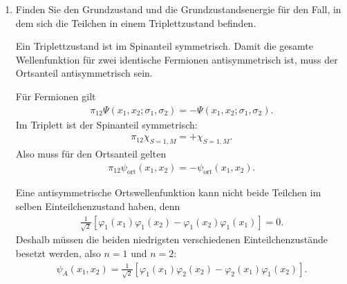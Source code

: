 \documentclass[11pt,a4paper]{scrartcl}
\newcommand{\Pex}{\pi_{12}}
\begin{document}
    \begin{enumerate}[label=(\alph*)]
        \item Finden Sie den Grundzustand und die Grundzustandsenergie für den Fall, in dem sich die Teilchen in einem Triplettzustand befinden.

        \begin{calculationbox}
            Ein Triplettzustand ist im Spinanteil symmetrisch. Damit die gesamte Wellenfunktion für zwei identische Fermionen antisymmetrisch ist, muss der Ortsanteil antisymmetrisch sein.

            \begin{calculationbox}[title=Symmetriebedingung]
                Für Fermionen gilt
                \begin{align*}
                    \Pex\Psi(x_1,x_2;\sigma_1,\sigma_2)=-\Psi(x_1,x_2;\sigma_1,\sigma_2).
                \end{align*}
                Im Triplett ist der Spinanteil symmetrisch:
                \begin{align*}
                    \Pex\chi_{S=1,M}=+\chi_{S=1,M}.
                \end{align*}
                Also muss für den Ortsanteil gelten
                \begin{align*}
                    \Pex\psi_{\mathrm{ort}}(x_1,x_2)=-\psi_{\mathrm{ort}}(x_1,x_2).
                \end{align*}
            \end{calculationbox}

            \begin{calculationbox}[title=Kleinste antisymmetrische Ortswellenfunktion]
                Eine antisymmetrische Ortswellenfunktion kann nicht beide Teilchen im selben Einteilchenzustand haben, denn
                \begin{align*}
                    \frac{1}{\sqrt2}\left[\varphi_1(x_1)\varphi_1(x_2)-\varphi_1(x_2)\varphi_1(x_1)\right]=0.
                \end{align*}
                Deshalb müssen die beiden niedrigsten verschiedenen Einteilchenzustände besetzt werden, also $n=1$ und $n=2$:
                \begin{align*}
                    \psi_A(x_1,x_2)
                    =
                    \frac{1}{\sqrt2}
                    \left[
                        \varphi_1(x_1)\varphi_2(x_2)
                        -
                        \varphi_2(x_1)\varphi_1(x_2)
                    \right].
                \end{align*}
            \end{calculationbox}


\end{calculationbox}
\end{enumerate}
\end{document}
